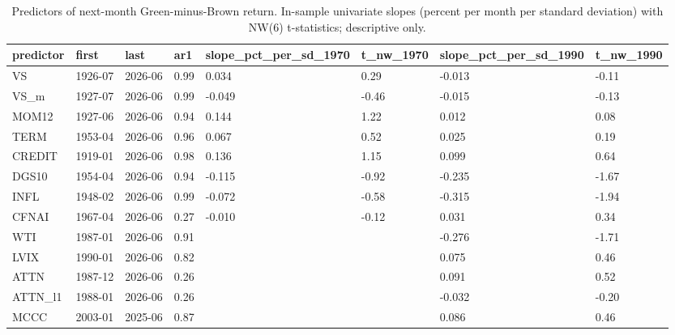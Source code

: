 \begin{table}
\caption{Predictors of next-month Green-minus-Brown return. In-sample univariate slopes (percent per month per standard deviation) with NW(6) t-statistics; descriptive only.}
\label{tab:m6_predictors}
\begin{tabular}{llllllll}
\toprule
predictor & first & last & ar1 & slope\_pct\_per\_sd\_1970 & t\_nw\_1970 & slope\_pct\_per\_sd\_1990 & t\_nw\_1990 \\
\midrule
VS & 1926-07 & 2026-06 & 0.99 & 0.034 & 0.29 & -0.013 & -0.11 \\
VS\_m & 1927-07 & 2026-06 & 0.99 & -0.049 & -0.46 & -0.015 & -0.13 \\
MOM12 & 1927-06 & 2026-06 & 0.94 & 0.144 & 1.22 & 0.012 & 0.08 \\
TERM & 1953-04 & 2026-06 & 0.96 & 0.067 & 0.52 & 0.025 & 0.19 \\
CREDIT & 1919-01 & 2026-06 & 0.98 & 0.136 & 1.15 & 0.099 & 0.64 \\
DGS10 & 1954-04 & 2026-06 & 0.94 & -0.115 & -0.92 & -0.235 & -1.67 \\
INFL & 1948-02 & 2026-06 & 0.99 & -0.072 & -0.58 & -0.315 & -1.94 \\
CFNAI & 1967-04 & 2026-06 & 0.27 & -0.010 & -0.12 & 0.031 & 0.34 \\
WTI & 1987-01 & 2026-06 & 0.91 &  &  & -0.276 & -1.71 \\
LVIX & 1990-01 & 2026-06 & 0.82 &  &  & 0.075 & 0.46 \\
ATTN & 1987-12 & 2026-06 & 0.26 &  &  & 0.091 & 0.52 \\
ATTN\_l1 & 1988-01 & 2026-06 & 0.26 &  &  & -0.032 & -0.20 \\
MCCC & 2003-01 & 2025-06 & 0.87 &  &  & 0.086 & 0.46 \\
\bottomrule
\end{tabular}
\end{table}
